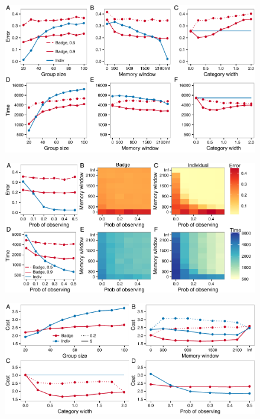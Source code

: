 \begin{figure}
\includegraphics[width=6.85in]{figures/parameters.pdf}
\caption{}
\end{figure}

\begin{figure}
\includegraphics[width=6.85in]{figures/observational_learning.pdf}
\caption{}
\end{figure}

\begin{figure}
\includegraphics[width=6.85in]{figures/costs.pdf}
\caption{}
\end{figure}

